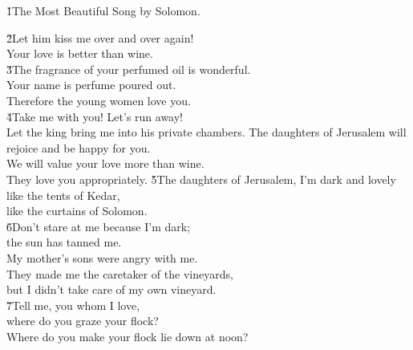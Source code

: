 


\v{1}The Most Beautiful Song by Solomon.

\begin{poetry}
\poeml \v{2}Let him kiss me over and over again! \\
\poemll    Your love is better than wine. \\
\poeml \v{3}The fragrance of your perfumed oil is wonderful. \\
\poemll    Your name is perfume poured out. \\
\poemlll       Therefore the young women love you. \\
\poeml \v{4}Take me with you! Let's run away! \\
\poemll    Let the king bring me into his private chambers.
\poeml The daughters of Jerusalem will rejoice and be happy for you. \\
\poemll    We will value your love more than wine. \\
\poemlll       They love you appropriately.
\poeml \v{5}The daughters of Jerusalem, I'm dark and lovely \\
\poemll    like the tents of Kedar, \\
\poemlll       like the curtains of Solomon. \\
\poeml \v{6}Don't stare at me because I'm dark; \\
\poemll    the sun has tanned me. \\
\poeml My mother's sons were angry with me. \\
\poemll    They made me the caretaker of the vineyards, \\
\poemlll       but I didn't take care of my own vineyard. \\
\poeml \v{7}Tell me, you whom I love, \\
\poemll    where do you graze your flock? \\
\poemlll       Where do you make your flock lie down at noon? \\

\end{poetry}

